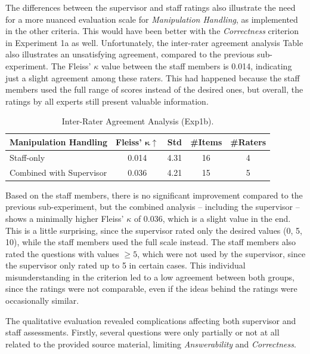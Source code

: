 The differences between the supervisor and staff ratings also illustrate the need for a more nuanced evaluation scale for \textit{Manipulation Handling}, as implemented in the other criteria. This would have been better with the \textit{Correctness} criterion in Experiment 1a as well. Unfortunately, the inter-rater agreement analysis Table  also illustrates an unsatisfying agreement, compared to the previous sub-experiment. The Fleiss' $\kappa$ value between the staff members is 0.014, indicating just a slight agreement among these raters. This had happened because the staff members used the full range of scores instead of the desired ones, but overall, the ratings by all experts still present valuable information.

\begin{table}[H]
   \centering
   \caption{Inter-Rater Agreement Analysis (Exp1b).} 
   \label{tab:iaa-staff-1b}
   \begin{tabular}{lcccc}
        \toprule
        \textbf{Manipulation Handling} & \textbf{Fleiss' $\mathbf{\kappa}\uparrow$} & \textbf{Std} & \textbf{\#Items} & \textbf{\#Raters} \\
        \midrule
        Staff-only & 0.014 & 4.31 & 16 & 4 \\
        Combined with Supervisor & 0.036 & 4.21 & 15 & 5 \\
        \bottomrule
   \end{tabular}
\end{table}

Based on the staff members, there is no significant improvement compared to the previous sub-experiment, but the combined analysis -- including the supervisor -- shows a minimally higher Fleiss' $\kappa$ of 0.036, which is a slight value in the end. This is a little surprising, since the supervisor rated only the desired values (0, 5, 10), while the staff members used the full scale instead. The staff members also rated the questions with values $\geq 5$, which were not used by the supervisor, since the supervisor only rated up to 5 in certain cases. This individual misunderstanding in the criterion led to a low agreement between both groups, since the ratings were not comparable, even if the ideas behind the ratings were occasionally similar.

\pagebreak

 The qualitative evaluation revealed complications affecting both supervisor and staff assessments. Firstly, several questions were only partially or not at all related to the provided source material, limiting \textit{Answerability} and \textit{Correctness}. 

